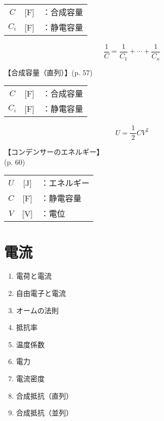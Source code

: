 \documentclass[10pt]{jarticle}
\begin{document}
\begin{tabular}{ccl}
$C$	&[F]	&：合成容量 \\
$C_i$	&[F]	&：静電容量 \\
\end{tabular}




\newpage
\[
\frac{1}{C} = \frac{1}{C_1} + \cdots + \frac{1}{C_n}
\]


\vskip3mm
【合成容量（直列）】{\footnotesize (p. 57)}

\begin{tabular}{ccl}
$C$	&[F]	&：合成容量 \\
$C_i$	&[F]	&：静電容量 \\
\end{tabular}



\newpage
\[
U = \frac{1}{\, 2 \,} C V^2
\]


\vskip3mm
【コンデンサーのエネルギー】\\
\hfill {\footnotesize (p. 60)}

\begin{tabular}{ccl}
$U$	&[J]	&：エネルギー \\
$C$	&[F]	&：静電容量 \\
$V$	&[V]	&：電位
\end{tabular}






\newpage
\addtocounter{page}{-1}
\thispagestyle{empty}
\section{電流}

\begin{enumerate}
\setcounter{enumi}{\thepage}
\small
\itemsep-4mm
\item 電荷と電流 \\
\item 自由電子と電流 \\
\item オームの法則 \\
\item 抵抗率 \\
\item 温度係数 \\
\item 電力 \\
\item 電流密度 \\
\item 合成抵抗（直列） \\
\item 合成抵抗（並列） \\
\end{enumerate}
\end{document}
